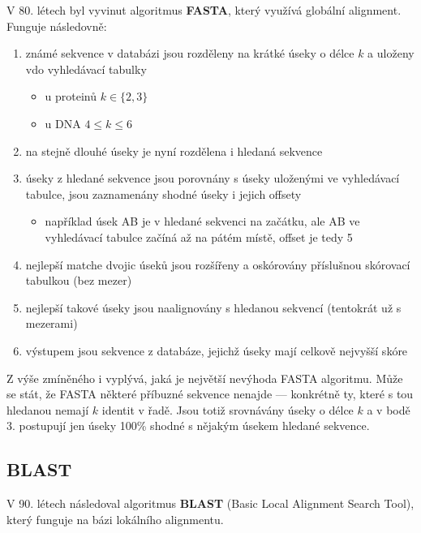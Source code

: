 \documentclass[DIV=8]{scrreprt}
\begin{document}
V 80. létech byl vyvinut algoritmus \textbf{FASTA}, který využívá globální alignment. Funguje následovně:
\begin{enumerate}[nosep]
    \item známé sekvence v databázi jsou rozděleny na krátké úseky o délce \(k\) a uloženy vdo vyhledávací tabulky
\begin{itemize}[nosep]
    \item u proteinů \(k \in \{2, 3\}\)
    \item u DNA \(4 \leq k \leq 6\)
\end{itemize}

    \item na stejně dlouhé úseky je nyní rozdělena i hledaná sekvence
    \item úseky z hledané sekvence jsou porovnány s úseky uloženými ve vyhledávací tabulce, jsou zaznamenány shodné úseky i jejich offsety
\begin{itemize}[nosep]
    \item například úsek AB je v hledané sekvenci na začátku, ale AB ve vyhledávací tabulce začíná až na pátém místě, offset je tedy 5
\end{itemize}

    \item nejlepší matche dvojic úseků jsou rozšířeny a oskórovány příslušnou skórovací tabulkou (bez mezer)
    \item nejlepší takové úseky jsou naalignovány s hledanou sekvencí (tentokrát už s mezerami)
    \item výstupem jsou sekvence z databáze, jejichž úseky mají celkově nejvyšší skóre
\end{enumerate}



Z výše zmíněného i vyplývá, jaká je největší nevýhoda FASTA algoritmu. Může se stát, že FASTA některé příbuzné sekvence nenajde --- konkrétně ty, které s tou hledanou nemají \(k\) identit v řadě. Jsou totiž srovnávány úseky o délce \(k\) a v bodě 3. postupují jen úseky 100\% shodné s nějakým úsekem hledané sekvence.

\subsection{BLAST} \label{BLAST}


V 90. létech následoval algoritmus \textbf{BLAST} (Basic Local Alignment Search Tool), který funguje na bázi lokálního alignmentu.
\end{document}
